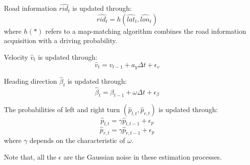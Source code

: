 \documentclass[journal]{IEEEtran}
\begin{document}
Road information $\hat{rid_t}$ is updated through:
\begin{equation}
    \hat{rid_t}=h(\hat{lat}_t,\hat{lon}_t)
\end{equation}
where $h(*)$ refers to a map-matching algorithm combines the road information acquisition with a driving probability.


Velocity $\hat{v}_t$ is updated through:
\begin{equation}
    \hat{v}_t=v_{t-1}+a_{y}\Delta t+\epsilon_v
\end{equation}

Heading direction $\hat{\beta}_t$ is updated through:
\begin{equation}
    \hat{\beta}_t=\beta_{t-1}+\omega\Delta t+\epsilon_\beta
\end{equation}


The probabilities of left and right turn $(\hat{p}_{l,t},\hat{p}_{r,t})$ is updated through:
\begin{equation}
    \hat{p}_{l,t}=\gamma \hat{p}_{l,t-1}+\epsilon_p
\end{equation}
\begin{equation}
    \hat{p}_{r,t}=\gamma \hat{p}_{r,t-1}+\epsilon_p
\end{equation}
where $\gamma$ depends on the characteristic of $\omega$.

Note that, all the $\epsilon$ are the Gaussian noise in these estimation processes.
\end{document}
